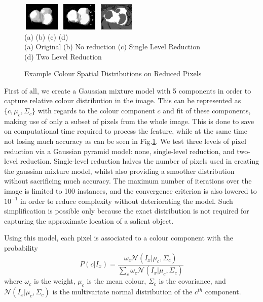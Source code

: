 \documentclass[10pt,twocolumn,letterpaper]{article}
\newcommand{\SUM}{\sum\limits}
\newcommand{\hs}{\hspace{0.58in}}
\begin{document}
\begin{figure}[t]
\begin{center}
    \includegraphics[width=0.72in,height=0.52in]{./Figures/pydownCompare/3NOPYDOWN.jpg}
    \includegraphics[width=0.72in,height=0.52in]{./Figures/pydownCompare/3PYDOWN.jpg} 
    \includegraphics[width=0.72in,height=0.52in]{./Figures/pydownCompare/3DOUBLEPYDOWN.jpg} \\
    \footnotesize \hspace{0.1cm} (a) \hs (b) \hs  (c) \hs (d) \\
    \footnotesize (a) Original (b) No reduction (c) Single Level Reduction\\ (d) Two Level Reduction
    \caption{Example Colour Spatial Distributions on Reduced Pixels} \label{Fig:GlobalPydown}
    \end{center}
\end{figure}

First of all, we create a Gaussian mixture model with 5 components in order to capture relative colour distribution in the image. This can be represented as $\{c, \mu_c, \Sigma_c\}$ with regards to the colour component $c$ and fit of these components, making use of only a subset of pixels from the whole image. This is done to save on computational time required to process the feature, while at the same time not losing much accuracy as can be seen in Fig.\ref{Fig:GlobalPydown}.  We test three levels of pixel reduction via a Gaussian pyramid model: none, single-level reduction, and two-level reduction.  Single-level reduction halves the number of pixels used in creating the gaussian mixture model, whilst also providing a smoother distribution without sacrificing much accuracy.  The maximum number of iterations over the image is limited to 100 instances, and the convergence criterion is also lowered to $10^{-1}$ in order to reduce complexity without deteriorating the model.  Such simplification is possible only because the exact distribution is not required for capturing the approximate location of a salient object.

Using this model, each pixel is associated to a colour component with the probability $$P(c|I_x) = \frac{\omega_c\mathcal{N}(I_x|\mu_c,\Sigma_c)}{\SUM_c \omega_c \mathcal{N}(I_x|\mu_c,\Sigma_c)}$$where $\omega_c$ is the weight, $\mu_c$ is the mean colour, $\Sigma_c$ is the covariance, and $\mathcal N(I_x|\mu_c,\Sigma_c)$ is the multivariate normal distribution of the $c^{th}$ component. 
\end{document}
